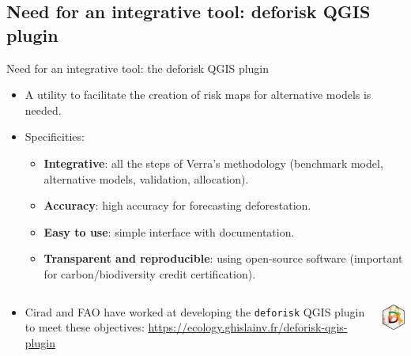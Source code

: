 \documentclass[10pt,table,dvipsnames,compress]{beamer}
\begin{document}
\subsection{Need for an integrative tool: deforisk QGIS plugin}
\label{sec:orgd5d10f5}

\begin{frame}[label={sec:org6f4589e},fragile]{Need for an integrative tool: the deforisk QGIS plugin}
 \begin{itemize}
\item A utility to facilitate the creation of risk maps for alternative models is needed.
\item Specificities:
\begin{itemize}
\item \textbf{Integrative}: all the steps of Verra's methodology (benchmark model, alternative models, validation, allocation).
\item \textbf{Accuracy}: high accuracy for forecasting deforestation.
\item \textbf{Easy to use}: simple interface with documentation.
\item \textbf{Transparent and reproducible}: using open-source software (important for carbon/biodiversity credit certification).
\end{itemize}
\end{itemize}

\begin{columns}
\begin{column}{0.8\columnwidth}
\begin{itemize}
\item Cirad and FAO have worked at developing the \texttt{deforisk} QGIS plugin to meet these objectives: \url{https://ecology.ghislainv.fr/deforisk-qgis-plugin}
\end{itemize}
\end{column}

\begin{column}{0.2\columnwidth}
\includegraphics[width=1.5cm]{figs/logo-deforisk.png}
\end{column}
\end{columns}
\end{frame}

\end{document}
